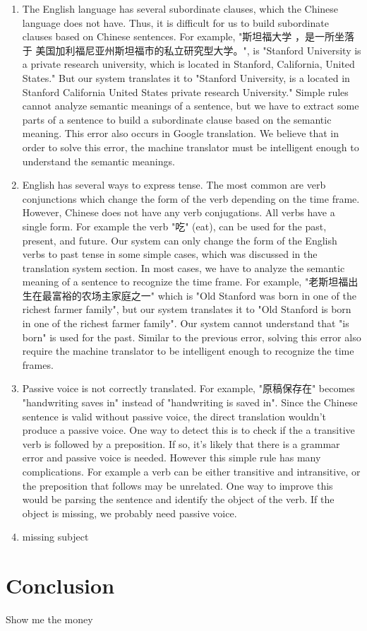\documentclass[11pt]{article} %
\begin{document}
\begin{CJK}{UTF8}{gbsn}
\begin{enumerate}
\item The English language has several subordinate clauses, which the Chinese language does not have. Thus, it is difficult for us to build subordinate clauses based on Chinese sentences. For example, "斯坦福大学 ，是一所坐落于 美国加利福尼亚州斯坦福市的私立研究型大学。", is "Stanford University is a private research university, which is located in Stanford, California, United States." But our system translates it to "Stanford University, is a located in Stanford California United States private research University." Simple rules cannot analyze semantic meanings of a sentence, but we have to extract some parts of a sentence to build a subordinate clause based on the semantic meaning. This error also occurs in Google translation. We believe that in order to solve this error, the machine translator must be intelligent enough to understand the semantic meanings.

\item English has several ways to express tense. The most common are verb conjunctions which change the form of the verb depending on the time frame. However, Chinese does not have any verb conjugations. All verbs have a single form. For example the verb "吃" (eat), can be used for the past, present, and future. Our system can only change the form of the English verbs to past tense in some simple cases, which was discussed in the translation system section. In most cases, we have to analyze the semantic meaning of a sentence to recognize the time frame. For example, "老斯坦福出生在最富裕的农场主家庭之一" which is "Old Stanford was born in one of the richest farmer family", but our system translates it to "Old Stanford is born in one of the richest farmer family". Our system cannot understand that "is born" is used for the past. Similar to the previous error, solving this error also require the machine translator to be intelligent enough to recognize the time frames.


\item Passive voice is not correctly translated. For example, "原稿保存在" becomes "handwriting saves in" instead of "handwriting is saved in". Since the Chinese sentence is valid without passive voice, the direct translation wouldn't produce a passive voice. One way to detect this is to check if the a transitive verb is followed by a preposition. If so, it's likely that there is a grammar error and passive voice is needed. However this simple rule has many complications. For example a verb can be either transitive and intransitive, or the preposition that follows may be unrelated. One way to improve this would be parsing the sentence and identify the object of the verb. If the object is missing, we probably need passive voice.

\item missing subject

\end{enumerate}

\section{Conclusion}
Show me the money
\end{CJK}
\end{document}
